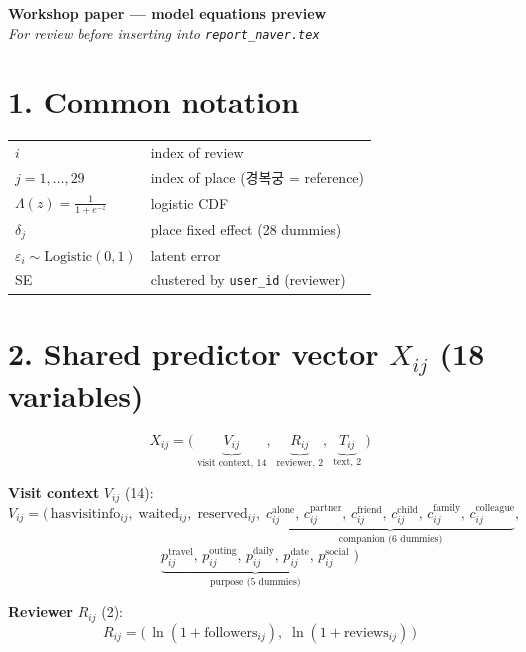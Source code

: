\documentclass[11pt,a4paper]{article}
\begin{document}
\begin{center}
\large\textbf{Workshop paper — model equations preview}\\[2pt]
\small \textit{For review before inserting into \texttt{report\_naver.tex}}
\end{center}

\hrulefill

\section*{1. Common notation}

\begin{tabular}{@{}l l@{}}
\toprule
$i$                 & index of review \\
$j = 1, \ldots, 29$ & index of place (경복궁 = reference) \\
$\Lambda(z) = \frac{1}{1 + e^{-z}}$ & logistic CDF \\
$\delta_j$          & place fixed effect (28 dummies) \\
$\varepsilon_i \sim \text{Logistic}(0, 1)$ & latent error \\
SE                  & clustered by \texttt{user\_id} (reviewer) \\
\bottomrule
\end{tabular}

\section*{2. Shared predictor vector \texorpdfstring{$X_{ij}$}{X} (18 variables)}

\[
X_{ij} = \bigl(\;\underbrace{V_{ij}}_{\text{visit context, 14}},\;
                 \underbrace{R_{ij}}_{\text{reviewer, 2}},\;
                 \underbrace{T_{ij}}_{\text{text, 2}}\;\bigr)
\]

\textbf{Visit context} $V_{ij}$ (14):
\[
V_{ij} = \bigl(\,\text{hasvisitinfo}_{ij},\;\text{waited}_{ij},\;\text{reserved}_{ij},\;
                 \underbrace{c^{\mathrm{alone}}_{ij},\, c^{\mathrm{partner}}_{ij},\, c^{\mathrm{friend}}_{ij},\,
                             c^{\mathrm{child}}_{ij},\, c^{\mathrm{family}}_{ij},\, c^{\mathrm{colleague}}_{ij}}_{\text{companion (6 dummies)}},
\]
\[
\underbrace{p^{\mathrm{travel}}_{ij},\, p^{\mathrm{outing}}_{ij},\, p^{\mathrm{daily}}_{ij},\,
            p^{\mathrm{date}}_{ij},\, p^{\mathrm{social}}_{ij}}_{\text{purpose (5 dummies)}}\;\bigr)
\]

\textbf{Reviewer} $R_{ij}$ (2):
\[
R_{ij} = \bigl(\,\ln(1 + \text{followers}_{ij}),\; \ln(1 + \text{reviews}_{ij})\,\bigr)
\]
\end{document}
